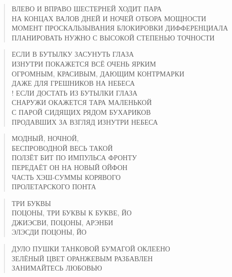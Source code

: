 \poemtitle{***}
\begin{verse}
ВЛЕВО И ВПРАВО ШЕСТЕРНЕЙ ХОДИТ ПАРА\\
НА КОНЦАХ ВАЛОВ ДНЕЙ И НОЧЕЙ ОТБОРА МОЩНОСТИ\\
МОМЕНТ ПРОСКАЛЬЗЫВАНИЯ БЛОКИРОВКИ ДИФФЕРЕНЦИАЛА\\
ПЛАНИРОВАТЬ НУЖНО С ВЫСОКОЙ СТЕПЕНЬЮ ТОЧНОСТИ
\end{verse}

\poemtitle{***}
\begin{verse}
ЕСЛИ В БУТЫЛКУ ЗАСУНУТЬ ГЛАЗА\\
ИЗНУТРИ ПОКАЖЕТСЯ ВСЁ ОЧЕНЬ ЯРКИМ\\
ОГРОМНЫМ, КРАСИВЫМ, ДАЮЩИМ КОНТРМАРКИ\\
ДАЖЕ ДЛЯ ГРЕШНИКОВ НА НЕБЕСА\\!
ЕСЛИ ДОСТАТЬ ИЗ БУТЫЛКИ ГЛАЗА\\
СНАРУЖИ ОКАЖЕТСЯ ТАРА МАЛЕНЬКОЙ\\
С ПАРОЙ СИДЯЩИХ РЯДОМ БУХАРИКОВ\\
ПРОДАВШИХ ЗА ВЗГЛЯД ИЗНУТРИ НЕБЕСА
\end{verse}

\poemtitle{***}
\begin{verse}
МОДНЫЙ, НОЧНОЙ, \\
    БЕСПРОВОДНОЙ ВЕСЬ ТАКОЙ\\
ПОЛЗЁТ БИТ ПО ИМПУЛЬСА ФРОНТУ\\
ПЕРЕДАЁТ ОН НА НОВЫЙ ОЙФОН\\
ЧАСТЬ ХЭШ-СУММЫ КОРЯВОГО \\
    ПРОЛЕТАРСКОГО ПОНТА
\end{verse}

\poemtitle{***}
\begin{verse}
ТРИ БУКВЫ\\
ПОЦОНЫ, ТРИ БУКВЫ К БУКВЕ, ЙО\\
ДЖИЭСВИ, ПОЦОНЫ, АРЭНБИ\\
ЭЛЭСДИ ПОЦОНЫ, ЙО
\end{verse}

\poemtitle{***}
\begin{verse}
ДУЛО ПУШКИ ТАНКОВОЙ БУМАГОЙ ОКЛЕЕНО\\
ЗЕЛЁНЫЙ ЦВЕТ ОРАНЖЕВЫМ РАЗБАВЛЕН\\
ЗАНИМАЙТЕСЬ ЛЮБОВЬЮ
\end{verse}

